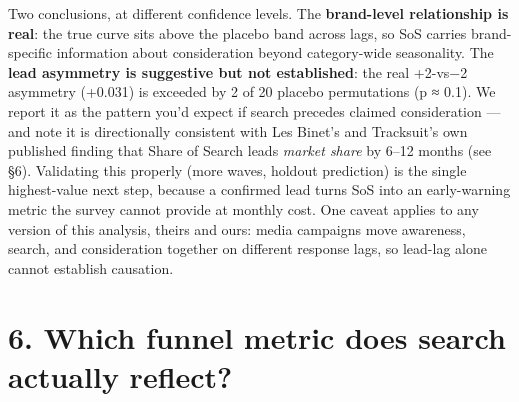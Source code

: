 \documentclass[
]{article}
\begin{document}
Two conclusions, at different confidence levels. The \textbf{brand-level
relationship is real}: the true curve sits above the placebo band across
lags, so SoS carries brand-specific information about consideration
beyond category-wide seasonality. The \textbf{lead asymmetry is
suggestive but not established}: the real +2-vs−2 asymmetry (+0.031) is
exceeded by 2 of 20 placebo permutations (p ≈ 0.1). We report it as the
pattern you'd expect if search precedes claimed consideration --- and
note it is directionally consistent with Les Binet's and Tracksuit's own
published finding that Share of Search leads \emph{market share} by
6--12 months (see §6). Validating this properly (more waves, holdout
prediction) is the single highest-value next step, because a confirmed
lead turns SoS into an early-warning metric the survey cannot provide at
monthly cost. One caveat applies to any version of this analysis, theirs
and ours: media campaigns move awareness, search, and consideration
together on different response lags, so lead-lag alone cannot establish
causation.

\hypertarget{funnel}{%
\section{6. Which funnel metric does search actually
reflect?}\label{funnel}}
\end{document}
